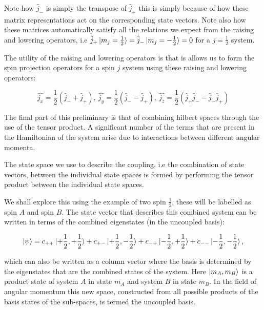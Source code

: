\documentclass[11pt,a4paper]{article}
\begin{document}
\noindent Note how $\hat{j}_-$ is simply the transpose of $\hat{j}_+$ this is simply because of how these matrix representations act on the corresponding state vectors. Note also how these matrices automatically satisfy all the relations we expect from the raising and lowering operators, i.e $\hat{j}_+ \ket{m_j = \frac{1}{2}} = \hat{j}_- \ket{m_j = - \frac{1}{2}} = 0$ for a $j = \frac{1}{2}$ system.

\noindent The utility of the raising and lowering operators is that is allows us to form the spin projection operators for a spin $j$ system using these raising and lowering operators:

\begin{equation}
    \hat{j_x} = \frac{1}{2}(\hat{j}_- + \hat{j}_+),~\hat{j_y} = \frac{1}{2}(\hat{j}_- - \hat{j}_+),~\hat{j_z} = \frac{1}{2}(\hat{j}_+ \hat{j}_- - \hat{j}_- \hat{j}_+)
    \label{GeneralSpin_j_ProjectionOperators}
\end{equation}

\noindent The final part of this preliminary is that of combining hilbert spaces through the use of the tensor product. A significant number of the terms that are present in the Hamiltonian of the system arise due to interactions between different angular momenta.

\noindent The state space we use to describe the coupling, i.e the combination of state vectors, between the individual state spaces is formed by performing the tensor product between the individual state spaces.

\noindent We shall explore this using the example of two spin $\frac{1}{2}$, these will be labelled as spin $A$ and spin $B$. The state vector that describes this combined system can be written in terms of the combined eigenstates (in the uncoupled basis):

\begin{equation}
    \ket{\psi} = c_{++} \ket{+\frac{1}{2}, +\frac{1}{2}} + c_{+-} \ket{+\frac{1}{2}, -\frac{1}{2}} + c_{-+} \ket{-\frac{1}{2}, +\frac{1}{2}} + c_{--} \ket{-\frac{1}{2}, -\frac{1}{2}},
\end{equation}

\noindent which can also be written as a column vector where the basis is determined by the eigenstates that are the combined states of the system. Here $\ket{m_A, m_B}$ is a product state of system $A$ in state $m_A$ and system $B$ in state $m_B$. In the field of angular momentum this new space, constructed from all possible products of the basis states of the sub-spaces, is termed the uncoupled basis.
\end{document}
